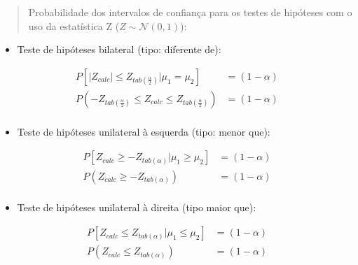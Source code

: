\documentclass[
]{book}
\providecommand{\tightlist}{%
  \setlength{\itemsep}{0pt}\setlength{\parskip}{0pt}}
\begin{document}
\begin{quote}
Probabilidade dos intervalos de confiança para os testes de hipóteses com o uso da estatística Z (\(Z \sim \mathcal{N}(0,1)\)):
\end{quote}

\hfill\break

\begin{itemize}
\tightlist
\item
  Teste de hipóteses bilateral (tipo: diferente de):
\end{itemize}

\hfill\break

\begin{align*}
P[\left|Z_{calc}\right| \le {Z}_{tab\left(\frac{\alpha }{2}\right)}|\mu_{1}=\mu_{2}] & =(1-\alpha)\\
P(-{Z}_{tab\left(\frac{\alpha }{2}\right)} \le Z_{calc} \le {Z}_{tab\left(\frac{\alpha }{2}\right)}) & = (1-\alpha)\\
\end{align*}

\hfill\break

\begin{itemize}
\tightlist
\item
  Teste de hipóteses unilateral à esquerda (tipo: menor que):
\end{itemize}

\hfill\break

\begin{align*}
P[Z_{calc} \ge -{Z}_{tab\left(\alpha \right)}|\mu_{1} \ge \mu_{2}] & =(1-\alpha) \\
P( Z_{calc}  \ge -{Z}_{tab\left(\alpha \right)}) & = (1-\alpha) \\
\end{align*}

\hfill\break

\begin{itemize}
\tightlist
\item
  Teste de hipóteses unilateral à direita (tipo maior que):
\end{itemize}

\hfill\break

\begin{align*}
P[Z_{calc} \le {Z}_{tab\left(\alpha \right)}|\mu_{1} \le \mu_{2}] & =(1-\alpha)  \\
P( Z_{calc}  \le {Z}_{tab\left(\alpha \right)}) & = (1-\alpha) \\
\end{align*}
\end{document}
